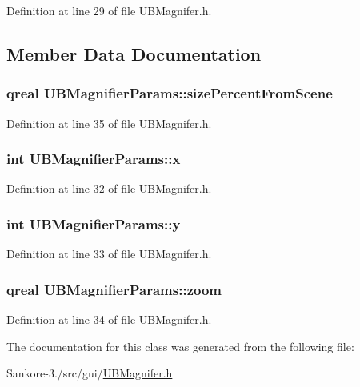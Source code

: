 Definition at line 29 of file U\-B\-Magnifer.\-h.



\subsection{Member Data Documentation}
\hypertarget{class_u_b_magnifier_params_a5f66a63500cfbcdae1142076be54f5fc}{
\subsubsection[{size\-Percent\-From\-Scene}]{\setlength{\rightskip}{0pt plus 5cm}qreal U\-B\-Magnifier\-Params\-::size\-Percent\-From\-Scene}}\label{de/df9/class_u_b_magnifier_params_a5f66a63500cfbcdae1142076be54f5fc}


Definition at line 35 of file U\-B\-Magnifer.\-h.

\hypertarget{class_u_b_magnifier_params_ad723e9f7b9c70e5595eeb964b140bcb8}{
\subsubsection[{x}]{\setlength{\rightskip}{0pt plus 5cm}int U\-B\-Magnifier\-Params\-::x}}\label{de/df9/class_u_b_magnifier_params_ad723e9f7b9c70e5595eeb964b140bcb8}


Definition at line 32 of file U\-B\-Magnifer.\-h.

\hypertarget{class_u_b_magnifier_params_a3948b6acc58f1028e2c7936bf8a23c93}{
\subsubsection[{y}]{\setlength{\rightskip}{0pt plus 5cm}int U\-B\-Magnifier\-Params\-::y}}\label{de/df9/class_u_b_magnifier_params_a3948b6acc58f1028e2c7936bf8a23c93}


Definition at line 33 of file U\-B\-Magnifer.\-h.

\hypertarget{class_u_b_magnifier_params_a5f687058468b6b83f15955c657480bc8}{
\subsubsection[{zoom}]{\setlength{\rightskip}{0pt plus 5cm}qreal U\-B\-Magnifier\-Params\-::zoom}}\label{de/df9/class_u_b_magnifier_params_a5f687058468b6b83f15955c657480bc8}


Definition at line 34 of file U\-B\-Magnifer.\-h.



The documentation for this class was generated from the following file\-:\begin{DoxyCompactItemize}
\item 
Sankore-\/3./src/gui/\hyperlink{_u_b_magnifer_8h}{U\-B\-Magnifer.\-h}\end{DoxyCompactItemize}

